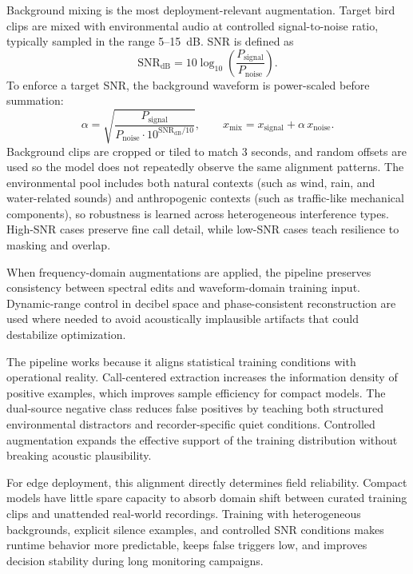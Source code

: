 \documentclass[a4paper,singleside,12pt]{report} %
\begin{document}
	Background mixing is the most deployment-relevant augmentation. Target bird clips are mixed with environmental audio at controlled signal-to-noise ratio, typically sampled in the range 5--15~dB. SNR is defined as
	\begin{equation}
		\mathrm{SNR}_{\mathrm{dB}} = 10 \log_{10}\!\left(\frac{P_{\mathrm{signal}}}{P_{\mathrm{noise}}}\right).
	\end{equation}
	To enforce a target SNR, the background waveform is power-scaled before summation:
	\begin{equation}
		\alpha = \sqrt{\frac{P_{\mathrm{signal}}}{P_{\mathrm{noise}} \cdot 10^{\mathrm{SNR}_{\mathrm{dB}}/10}}}, \qquad
		x_{\mathrm{mix}} = x_{\mathrm{signal}} + \alpha\,x_{\mathrm{noise}}.
	\end{equation}
	Background clips are cropped or tiled to match 3 seconds, and random offsets are used so the model does not repeatedly observe the same alignment patterns. The environmental pool includes both natural contexts (such as wind, rain, and water-related sounds) and anthropogenic contexts (such as traffic-like mechanical components), so robustness is learned across heterogeneous interference types. High-SNR cases preserve fine call detail, while low-SNR cases teach resilience to masking and overlap.

		\begin{sloppypar}
		When frequency-domain augmentations are applied, the pipeline preserves consistency between spectral edits and waveform-domain training input. Dynamic-range control in decibel space and phase-consistent reconstruction are used where needed to avoid acoustically implausible artifacts that could destabilize optimization.
		\end{sloppypar}

	The pipeline works because it aligns statistical training conditions with operational reality. Call-centered extraction increases the information density of positive examples, which improves sample efficiency for compact models. The dual-source negative class reduces false positives by teaching both structured environmental distractors and recorder-specific quiet conditions. Controlled augmentation expands the effective support of the training distribution without breaking acoustic plausibility.

	For edge deployment, this alignment directly determines field reliability. Compact models have little spare capacity to absorb domain shift between curated training clips and unattended real-world recordings. Training with heterogeneous backgrounds, explicit silence examples, and controlled SNR conditions makes runtime behavior more predictable, keeps false triggers low, and improves decision stability during long monitoring campaigns.
\end{document}
